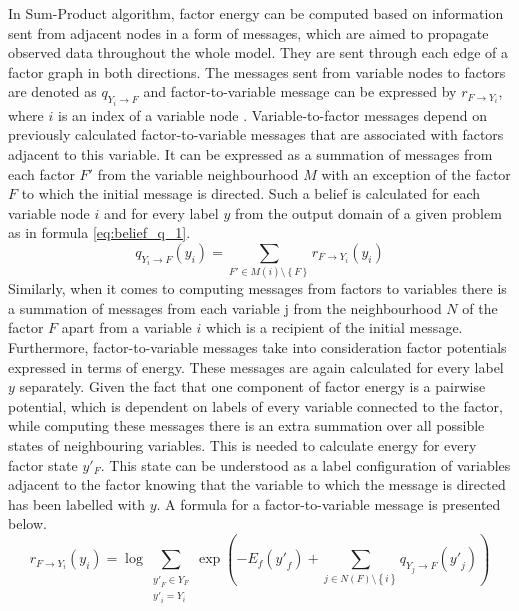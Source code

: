 In Sum-Product algorithm, factor energy can be computed based on information sent from adjacent nodes in a form of messages, which are aimed to propagate observed data throughout the whole model. They are sent through each edge of a factor graph in both directions. The messages sent from variable nodes to factors are denoted as $q_{Y_i\rightarrow F}$ and factor-to-variable message can be expressed by $r_{F\rightarrow Y_i}$, where $i$ is an index of a variable node \cite{Nowozin}. Variable-to-factor messages depend on previously calculated factor-to-variable messages that are associated with factors adjacent to this variable. It can be expressed as a summation of messages from each factor $F'$ from the variable neighbourhood $M$ with an exception of the factor $F$ to which the initial message is directed. Such a belief is calculated for each variable node $i$ and for every label $y$ from the output domain of a given problem as in formula \ref{eq:belief_q_1}.
\begin{equation}
    \label{eq:belief_q_1}
    q_{Y_i\rightarrow F}(y_i)=\sum_{F' \in M(i) \setminus \left \{ F \right \} }{ r_{F\rightarrow Y_i}(y_i)}
\end{equation}
Similarly, when it comes to computing messages from factors to variables there is a summation of messages from each variable j from the neighbourhood $N$ of the factor $F$ apart from a variable $i$ which is a recipient of the initial message. Furthermore, factor-to-variable messages take into consideration factor potentials expressed in terms of energy. These messages are again calculated for every label $y$ separately. Given the fact that one component of factor energy is a pairwise potential, which is dependent on labels of every variable connected to the factor, while computing these messages there is an extra summation over all possible states of neighbouring variables. This is needed to calculate energy for every factor state $y'_F$. This state can be understood as a label configuration of variables adjacent to the factor knowing that the variable to which the message is directed has been labelled with $y$. A formula for a factor-to-variable message is presented below. 
\begin{equation}
    r_{F\rightarrow Y_i}(y_i) = \log{
        \sum_{\substack{{y'}_{F}\in Y_{F}                               \\ {y'}_i = Y_i}}
        \exp{(-{E_f}({y'}_f) +
        \sum_{j \in N (F) \setminus \left \{ i \right \}}
            {q_{Y_j\rightarrow F}({y'}_j)}
    )} }
\end{equation}

